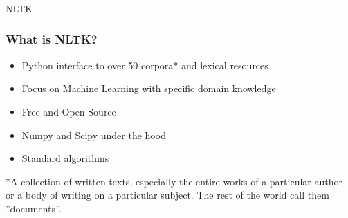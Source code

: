 
\begin{frame}[fragile]\frametitle{}

\begin{center}
{\Large NLTK}
\end{center}
\end{frame}
%

\begin{frame}[fragile]\frametitle{What is NLTK?}
  \begin{itemize}
    \item Python interface to over 50 corpora* and lexical resources
    \item Focus on Machine Learning with specific domain knowledge
    \item Free and Open Source
    \item Numpy and Scipy under the hood
    \item Standard algorithms
  \end{itemize}
*A collection of written texts, especially the entire works of a particular author or a body of writing on a particular subject. The rest of the world call them ''documents''.
\end{frame}


